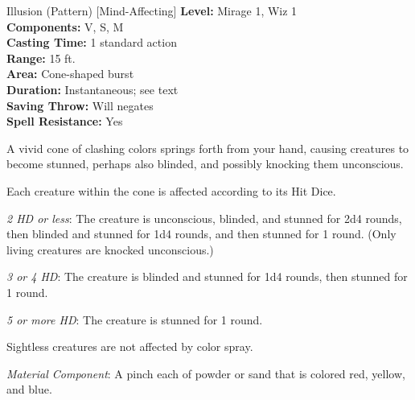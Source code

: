 {Illusion (Pattern) [Mind-Affecting]}
{
	\textbf{Level:}
	Mirage 1, Wiz 1\\
	\textbf{Components:}
	V, S, M\\
	\textbf{Casting Time:}
	1 standard action\\
	\textbf{Range:}
	15 ft.\\
	\textbf{Area:}
	Cone-shaped burst\\
	\textbf{Duration:}
	Instantaneous; see text\\
	\textbf{Saving Throw:}
	Will negates\\
	\textbf{Spell Resistance:}
	Yes\\
}
{
	A vivid cone of clashing colors springs forth from your hand, causing creatures to become stunned, perhaps also blinded, and possibly knocking them unconscious.

	Each creature within the cone is affected according to its Hit Dice.

	\textit{2 HD or less}:
	The creature is unconscious, blinded, and stunned for 2d4 rounds, then blinded and stunned for 1d4 rounds, and then stunned for 1 round. (Only living creatures are knocked unconscious.)

	\textit{3 or 4 HD}:
	The creature is blinded and stunned for 1d4 rounds, then stunned for 1 round.

	\textit{5 or more HD}:
	The creature is stunned for 1 round.

	Sightless creatures are not affected by color spray.

	\textit{Material Component}:
	A pinch each of powder or sand that is colored red, yellow, and blue.

}
